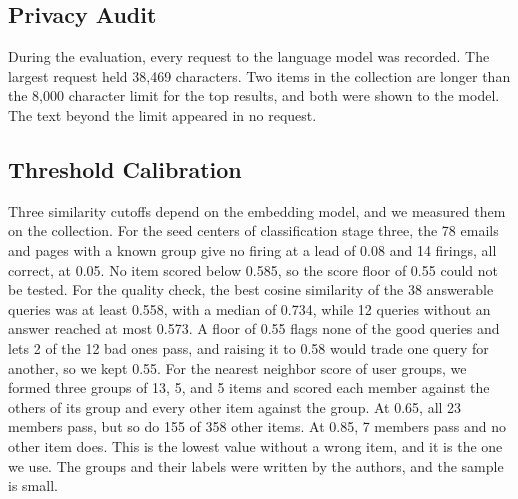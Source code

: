 \documentclass[conference]{IEEEtran}
\begin{document}
\subsection{Privacy Audit}
During the evaluation, every request to the language model was recorded. The largest request held 38,469 characters. Two items in the collection are longer than the 8,000 character limit for the top results, and both were shown to the model. The text beyond the limit appeared in no request.

\subsection{Threshold Calibration}
Three similarity cutoffs depend on the embedding model, and we measured them on the collection. For the seed centers of classification stage three, the 78 emails and pages with a known group give no firing at a lead of 0.08 and 14 firings, all correct, at 0.05. No item scored below 0.585, so the score floor of 0.55 could not be tested. For the quality check, the best cosine similarity of the 38 answerable queries was at least 0.558, with a median of 0.734, while 12 queries without an answer reached at most 0.573. A floor of 0.55 flags none of the good queries and lets 2 of the 12 bad ones pass, and raising it to 0.58 would trade one query for another, so we kept 0.55. For the nearest neighbor score of user groups, we formed three groups of 13, 5, and 5 items and scored each member against the others of its group and every other item against the group. At 0.65, all 23 members pass, but so do 155 of 358 other items. At 0.85, 7 members pass and no other item does. This is the lowest value without a wrong item, and it is the one we use. The groups and their labels were written by the authors, and the sample is small.

\end{document}
